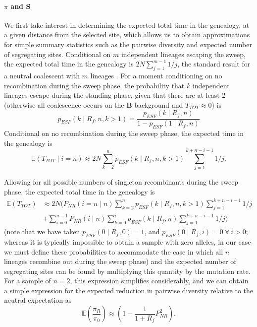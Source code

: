 \documentclass[a4paper,10pt]{article}
\begin{document}
\paragraph{$\pi$ and S} We first take interest in determining the expected total time in the genealogy, at a given distance from the selected site, which allows us to obtain approximations for simple summary statistics such as the pairwise diversity and expected number of segregating sites. Conditional on $m$ independent lineages escaping the sweep, the expected total time in the genealogy is $2N \sum_{j=1}^{m-1} 1/j$, the standard result for a neutral coalescent with $m$ lineages \citep{Watterson:1975ur}. For a moment conditioning on no recombination during the sweep phase, the probability that $k$ independent lineages escape during the standing phase, given that there are at least 2 (otherwise all coalescence occurs on the $\textbf{B}$ background and $T_{TOT} \approx 0$) is 
\begin{equation}
	p_{ESF}\left(k \mid R_f , n , k > 1\right) = \frac{p_{ESF}\left(k \mid R_f , n \right)}{1 - p_{ESF}\left(1 \mid R_f , n \right)}
\end{equation}
Conditional on no recombination during the sweep phase, the expected time in the genealogy is
\begin{equation}
	\mathbb{E}\left(T_{TOT} \mid i = n \right)  \approx 2N \sum_{k=2}^n p_{ESF}(k\mid R_f,n, k>1)   \sum_{j=1}^{k+n-i-1} 1/j.
\end{equation}

Allowing for all possible numbers of singleton recombinants during the sweep phase, the expected total time in the genealogy is
\begin{equation}
	\begin{aligned}
		\mathbb{E}(T_{TOT})  	&\approx 2N \biggl( P_{NR}(i=n\mid  n)  \sum_{k=2}^n p_{ESF}(k\mid R_f,n , k > 1)   \sum_{j=1}^{k+n-i-1} 1/j \\
							&+ \sum_{i=0}^{n-1} P_{NR} ( i \mid n) \sum_{k=0}^i p_{ESF}(k\mid R_f,n)   \sum_{j=1}^{k+n-i-1} 1/j\biggr)
	\end{aligned}
\end{equation}
(note that we have taken $p_{ESF}\left(0 \mid R_f,0\right)=1$, and $p_{ESF}\left(0 \mid R_f,i\right)=0\ \forall\ i > 0$; whereas it is typically impossible to obtain a sample with zero alleles, in our case we must define these probabilities to accommodate the case in which all $n$ lineages recombine out during the sweep phase)
and the expected number of segregating sites can be found by multiplying this quantity by the mutation rate. For a sample of $n = 2$, this expression simplifies considerably, and we can obtain a simple expression for the expected reduction in pairwise diversity relative to the neutral expectation as
\begin{equation}
	\mathbb{E}\left(\frac{\pi_R}{\pi_0}\right) \approx \left(1-\frac{1}{1 + R_f} P_{NR}^2  \right).
\end{equation}
\end{document}
